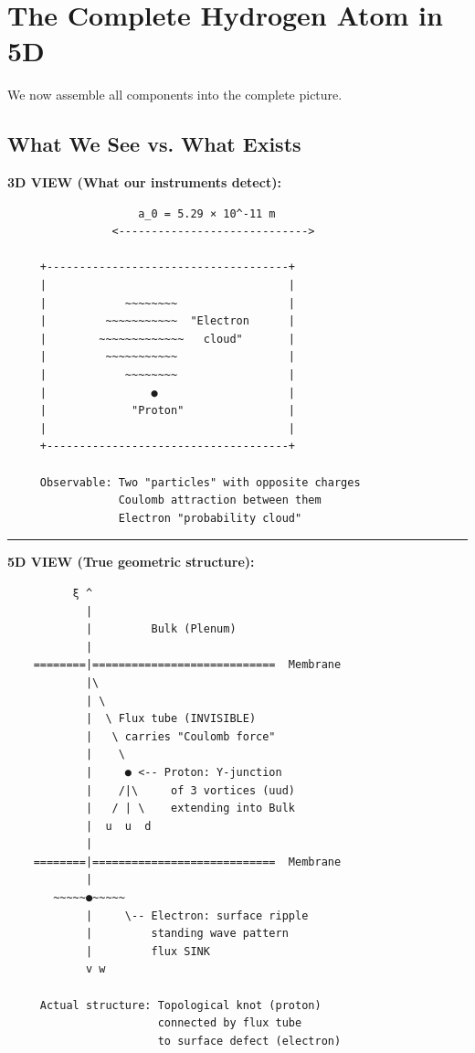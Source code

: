 \section{The Complete Hydrogen Atom in 5D}
\label{sec:hydrogen_complete}

We now assemble all components into the complete picture.

\subsection{What We See vs. What Exists}
\label{subsec:see_vs_exists}

\begin{tcolorbox}[colback=white,colframe=black,title=\textbf{HYDROGEN ATOM: OBSERVABLE vs. TRUE STRUCTURE}]

\textbf{3D VIEW (What our instruments detect):}
\begin{verbatim}
                    a_0 = 5.29 × 10^-11 m
                <----------------------------->
                
     +-------------------------------------+
     |                                     |
     |            ~~~~~~~~                 |
     |         ~~~~~~~~~~~  "Electron      |
     |        ~~~~~~~~~~~~~   cloud"       |
     |         ~~~~~~~~~~~                 |
     |            ~~~~~~~~                 |
     |                ●                    |
     |             "Proton"                |
     |                                     |
     +-------------------------------------+
     
     Observable: Two "particles" with opposite charges
                 Coulomb attraction between them
                 Electron "probability cloud"
\end{verbatim}

\rule{\textwidth}{0.4pt}

\textbf{5D VIEW (True geometric structure):}
\begin{verbatim}
          ξ ^
            |
            |         Bulk (Plenum)
            |
    ========|============================  Membrane
            |\
            | \
            |  \ Flux tube (INVISIBLE)
            |   \ carries "Coulomb force"
            |    \
            |     ● <-- Proton: Y-junction
            |    /|\     of 3 vortices (uud)
            |   / | \    extending into Bulk
            |  u  u  d
            |
    ========|============================  Membrane
            |
       ~~~~~●~~~~~
            |     \-- Electron: surface ripple
            |         standing wave pattern
            |         flux SINK
            v w
            
     Actual structure: Topological knot (proton)
                       connected by flux tube
                       to surface defect (electron)
\end{verbatim}
\end{tcolorbox}

